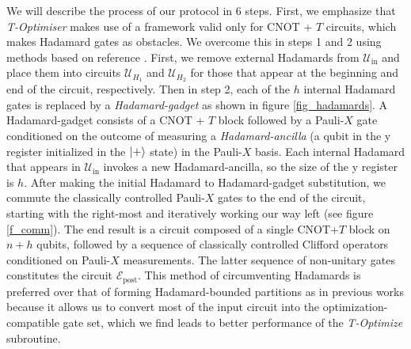 \documentclass[notitlepage]{article}
\theoremstyle{definition}
\theoremstyle{problem}
\theoremstyle{lemma}
\begin{document}
We will describe the process of our protocol in 6 steps. First, we emphasize that \emph{T-Optimiser} makes use of a framework valid only for CNOT + $T$ circuits, which makes Hadamard gates as obstacles. We overcome this in steps 1 and 2 using methods based on reference \cite{1_Montanaro_2017}. First, we remove external Hadamards
from $\mathcal{U}_{\text{in}}$ and place them into circuits $\mathcal{U}_{H_1}$ and $\mathcal{U}_{H_2}$ for those that appear at the beginning and end of the circuit, respectively. Then in step 2, each of the $h$ internal Hadamard gates is replaced by a \emph{Hadamard-gadget} as shown in figure \ref{fig_hadamards}. A Hadamard-gadget consists of a CNOT + $T$ block followed by a Pauli-$X$ gate conditioned on the outcome of measuring a \emph{Hadamard-ancilla} (a qubit in the y register initialized in the $\left\vert{+}\right\rangle$ state) in the Pauli-$X$ basis. Each internal Hadamard that appears in $\mathcal{U}_{\text{in}}$ invokes a new Hadamard-ancilla, so the size of the y register is $h$. After making the initial Hadamard to Hadamard-gadget substitution, we commute the classically controlled Pauli-$X$ gates to the end of the circuit, starting with the right-most and iteratively working our way left  (see figure \ref{f_comm}). The end result is a circuit composed of a single CNOT+$T$ block on $n+h$ qubits, followed by a sequence of classically controlled Clifford operators conditioned on Pauli-$X$ measurements. The latter sequence of non-unitary gates constitutes the circuit $\mathcal{E}_{\text{post}}$. This method of circumventing Hadamards is preferred over that of forming Hadamard-bounded partitions as in previous works \cite{6_Amy_2013} because it allows us to convert most of the input circuit into the optimization-compatible gate set, which we find leads to better performance of the \emph{T-Optimize} subroutine.
\end{document}
